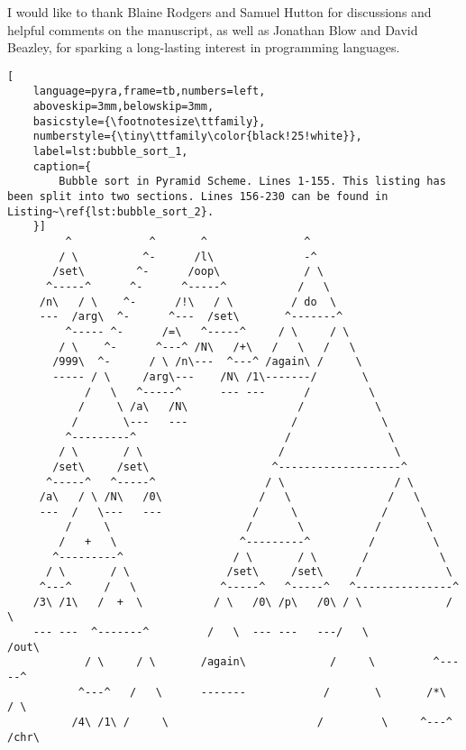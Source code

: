 \documentclass[aip,jcp,reprint,footinbib]{revtex4-1}
\begin{document}
I would like to thank Blaine Rodgers and Samuel Hutton for discussions and helpful comments on the manuscript, as well as Jonathan Blow and David Beazley, for sparking a long-lasting interest in programming languages.

\nocite{*}



\onecolumngrid
\begin{lstlisting}[
    language=pyra,frame=tb,numbers=left,
    aboveskip=3mm,belowskip=3mm,
    basicstyle={\footnotesize\ttfamily},
    numberstyle={\tiny\ttfamily\color{black!25!white}},
    label=lst:bubble_sort_1,
    caption={
        Bubble sort in Pyramid Scheme. Lines 1-155. This listing has been split into two sections. Lines 156-230 can be found in Listing~\ref{lst:bubble_sort_2}.
    }]
         ^            ^       ^               ^
        / \          ^-      /l\              -^
       /set\        ^-      /oop\             / \
      ^-----^      ^-      ^-----^           /   \
     /n\   / \    ^-      /!\   / \         / do  \
     ---  /arg\  ^-      ^---  /set\       ^-------^
         ^----- ^-      /=\   ^-----^     / \     / \
        / \    ^-      ^---^ /N\   /+\   /   \   /   \
       /999\  ^-      / \ /n\---  ^---^ /again\ /     \
       ----- / \     /arg\---    /N\ /1\-------/       \
            /   \   ^-----^      --- ---      /         \
           /     \ /a\   /N\                 /           \
          /       \---   ---                /             \
         ^---------^                       /               \
        / \       / \                     /                 \
       /set\     /set\                   ^-------------------^
      ^-----^   ^-----^                 / \                 / \
     /a\   / \ /N\   /0\               /   \               /   \
     ---  /   \---   ---              /     \             /     \
         /     \                     /       \           /       \
        /   +   \                   ^---------^         /         \
       ^---------^                 / \       / \       /           \
      / \       / \               /set\     /set\     /             \
     ^---^     /   \             ^-----^   ^-----^   ^---------------^
    /3\ /1\   /  +  \           / \   /0\ /p\   /0\ / \             / \
    --- ---  ^-------^         /   \  --- ---   ---/   \           /out\
            / \     / \       /again\             /     \         ^-----^
           ^---^   /   \      -------            /       \       /*\   / \
          /4\ /1\ /     \                       /         \     ^---^ /chr\

\end{lstlisting}
\end{document}
